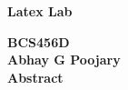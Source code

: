 \documentclass[12pt, a4paper]{article}
\begin{document}
\begin{center}
\Large 
\textbf{Latex Lab}\\
\vspace{0.5cm}

\large
\textbf{BCS456D}\\
\vspace{0.5cm}
\large
\textbf{Abhay G Poojary}\\
\vspace{1cm}
\large
\textbf{Abstract}\\
\end{center}
\lipsum[1]
\end{document}
